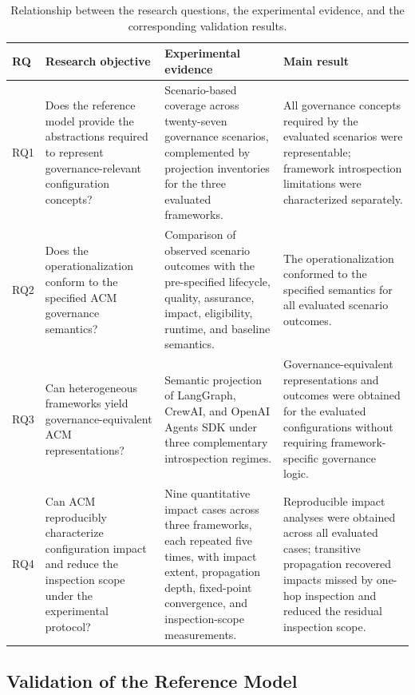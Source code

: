 \documentclass[10pt]{article}
\begin{document}
\begin{table}[t]
	\caption{Relationship between the research questions, the experimental evidence, and the corresponding validation results.}
	\label{tab:rq_validation}
	\centering
	\footnotesize
	\begin{tabular}{p{1.0cm}p{4.0cm}p{4.2cm}p{3.0cm}}
		\toprule
		\textbf{RQ} &
		\textbf{Research objective} &
		\textbf{Experimental evidence} &
		\textbf{Main result} \\
		\midrule
		
		RQ1 & Does the reference model provide the abstractions required to represent governance-relevant configuration concepts? & Scenario-based coverage across twenty-seven governance scenarios, complemented by projection inventories for the three evaluated frameworks. & All governance concepts required by the evaluated scenarios were representable; framework introspection limitations were characterized separately. 
		\\ 
		RQ2 & Does the operationalization conform to the specified ACM governance semantics? & Comparison of observed scenario outcomes with the pre-specified lifecycle, quality, assurance, impact, eligibility, runtime, and baseline semantics. & The operationalization conformed to the specified semantics for all evaluated scenario outcomes. 
		\\ 
		RQ3 & Can heterogeneous frameworks yield governance-equivalent ACM representations? & Semantic projection of LangGraph, CrewAI, and OpenAI Agents SDK under three complementary introspection regimes. & Governance-equivalent representations and outcomes were obtained for the evaluated configurations without requiring framework-specific governance logic. 
		\\ 
		RQ4 & Can ACM reproducibly characterize configuration impact and reduce the inspection scope under the experimental protocol? & Nine quantitative impact cases across three frameworks, each repeated five times, with impact extent, propagation depth, fixed-point convergence, and inspection-scope measurements. & Reproducible impact analyses were obtained across all evaluated cases; transitive propagation recovered impacts missed by one-hop inspection and reduced the residual inspection scope. \\
		
		\bottomrule
	\end{tabular}
\end{table}

\subsection{Validation of the Reference Model}
\label{sec:reference_model_validation}
\end{document}
